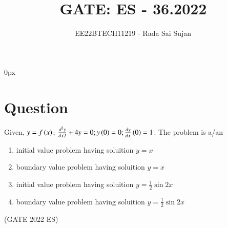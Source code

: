 \documentclass[journal,12pt,twocolumn]{IEEEtran}
\theoremstyle{remark}
\begin{document}
\parindent 0px

\title{GATE: ES - 36.2022}
\author{EE22BTECH11219 - Rada Sai Sujan$^{}$%
}
\maketitle
\newpage
\bigskip
\section*{Question}
Given, $y=f\left(x\right)$; $\frac{d^2y}{dx2}+4y=0; y\left(0\right)=0; \frac{dy}{dx}\left(0\right)=1$. The problem is a/an \\
\begin{enumerate}[label=(\alph*)]
    \item initial value problem having soluition $y=x$
    \item boundary value problem having soluition $y=x$
    \item initial value problem having soluition $y=\frac{1}{2}\sin 2x$
    \item boundary value problem having soluition {$y=\frac{1}{2}\sin 2x$}
\end{enumerate} \hfill(GATE 2022 ES)    \\
\solution
\end{document}
